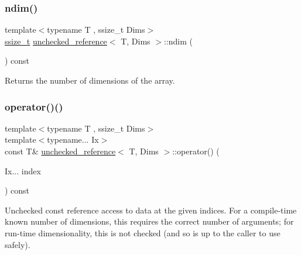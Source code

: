 \subsubsection{\texorpdfstring{ndim()}{ndim()}}
{\footnotesize\ttfamily template$<$typename T , ssize\+\_\+t Dims$>$ \\
\mbox{\hyperlink{detail_2common_8h_ac430d16fc097b3bf0a7469cfd09decda}{ssize\+\_\+t}} \mbox{\hyperlink{classunchecked__reference}{unchecked\+\_\+reference}}$<$ T, Dims $>$\+::ndim (\begin{DoxyParamCaption}{ }\end{DoxyParamCaption}) const\hspace{0.3cm}{\ttfamily [inline]}}



Returns the number of dimensions of the array. 

\mbox{\label{classunchecked__reference_a0da3998ef32834892f5b59529db3efd5}} 
\subsubsection{\texorpdfstring{operator()()}{operator()()}}
{\footnotesize\ttfamily template$<$typename T , ssize\+\_\+t Dims$>$ \\
template$<$typename... Ix$>$ \\
const T\& \mbox{\hyperlink{classunchecked__reference}{unchecked\+\_\+reference}}$<$ T, Dims $>$\+::operator() (\begin{DoxyParamCaption}\item[{Ix...}]{index }\end{DoxyParamCaption}) const\hspace{0.3cm}{\ttfamily [inline]}}

Unchecked const reference access to data at the given indices. For a compile-\/time known number of dimensions, this requires the correct number of arguments; for run-\/time dimensionality, this is not checked (and so is up to the caller to use safely). \mbox{\label{classunchecked__reference_a97fd086abe6908571f2089398d476105}} 
